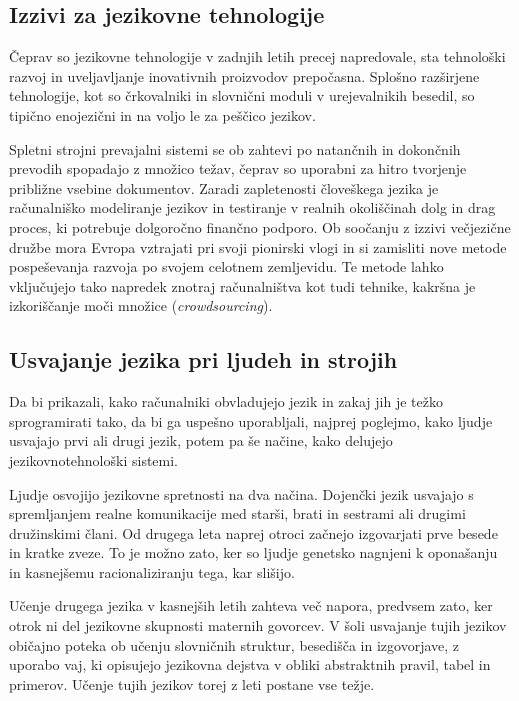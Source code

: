 \begin{multicols}{2}
\subsection{Izzivi za jezikovne tehnologije}

Čeprav so jezikovne tehnologije v zadnjih letih precej napredovale, sta tehnološki razvoj in uveljav\-ljanje inovativnih proizvodov prepočasna. Splošno razširjene tehnologije, kot so črkovalniki in slovnični moduli v urejevalnikih besedil, so tipično enojezični in na voljo le za peščico jezikov. 


Spletni stroj\-ni prevajalni sistemi se ob zah\-tevi po natančnih in dokončnih prevodih spopadajo z množico težav, čeprav so uporabni za hitro tvorjenje približne vsebine dokumentov. Zaradi zapletenosti človeškega jezika je računalniško mode\-liranje jezikov in testiranje v realnih okoliščinah dolg in drag proces, ki potrebuje dolgoročno finančno podporo. Ob soočanju z izzivi večjezične družbe mora Evropa vztrajati pri svoji pionirski vlogi in si zamisliti nove metode pospeševanja razvoja po svojem celotnem zemljevidu. Te metode lahko vključujejo tako napredek znotraj računalništva kot tudi tehnike, kakršna je izkoriščanje moči množice (\textit{crowdsourcing}).

\subsection{Usvajanje jezika pri ljudeh in strojih}

Da bi prikazali, kako računalniki obvladujejo jezik in zakaj jih je težko sprogramirati tako, da bi ga uspešno uporab\-ljali, naj\-prej poglejmo, kako ljudje usvajajo prvi ali drugi jezik, potem pa še načine, kako delujejo jezikovnotehnološki sistemi.

Ljudje osvojijo jezikovne spretnosti na dva načina. Dojenčki jezik usvajajo s spremljanjem realne komunikacije med starši, brati in sestrami ali drugimi družinskimi člani. Od drugega leta naprej otroci začnejo izgovarjati prve besede in kratke zveze. To je možno zato, ker so ljudje genetsko nagnjeni k oponašanju in kasnejšemu racionaliziranju tega, kar slišijo.

Učenje drugega jezika v kasnejših letih zah\-teva več napora, predvsem zato, ker otrok ni del jezikovne skupnosti maternih go\-vorcev. V šoli usvajanje tujih jezikov običajno poteka ob učenju slovničnih struktur, besedišča in izgo\-vorjave, z uporabo vaj, ki opisujejo jezikovna dejstva v obliki abstraktnih pravil, tabel in primerov. Učenje tujih jezikov torej z leti postane vse težje. 


\end{multicols}
